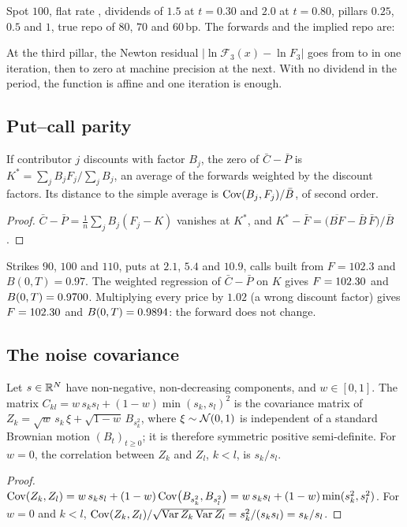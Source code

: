 \begin{example}\label{ex-bootstrap}
Spot $100$, flat rate , dividends of $\num{1.5}$ at $t=\num{0.30}$ and $\num{2.0}$ at $t=\num{0.80}$, pillars
$\num{0.25}$, $\num{0.5}$ and $1$, true repo of $80$, $70$ and $60$\,bp. The forwards and the implied repo are:
\begin{center}\end{center}
At the third pillar, the Newton residual $|\ln\mathcal F_3(x)-\ln F_3|$ goes from \vNewtonA{} to \vNewtonB{} in one
iteration, then to zero at machine precision at the next. With no dividend in the period, the function is affine and
one iteration is enough.
\end{example}

\subsection{Put--call parity}\label{app-parity}
\begin{lemma}
If contributor $j$ discounts with factor $B_j$, the zero of $\bar C-\bar P$ is $K^\ast=\sum_jB_jF_j\big/\sum_jB_j$, an
average of the forwards weighted by the discount factors. Its distance to the simple average is
$\operatorname{Cov}(B_j, F_j)/\bar B$, of second order.
\end{lemma}
\begin{proof}
$\bar C-\bar P=\frac1n\sum_jB_j(F_j-K)$ vanishes at $K^\ast$, and
$K^\ast-\bar F=\bigl(\overline{BF}-\bar B\,\bar F\bigr)/\bar B$.
\end{proof}

\begin{example}[Parity]\label{ex-parity}
Strikes $90$, $100$ and $110$, puts at $\num{2.1}$, $\num{5.4}$ and $\num{10.9}$, calls built from $F=\num{102.3}$ and
$B(0, T)=\num{0.97}$. The weighted regression of $\bar C-\bar P$ on $K$ gives $F=\num{102.30}$ and $B(0, T)=\num{0.9700}$.
Multiplying every price by $\num{1.02}$ (a wrong discount factor) gives $F=\num{102.30}$ and $B(0, T)=\num{0.9894}$: the
forward does not change.
\end{example}

\subsection{The noise covariance}\label{app-noise}
\begin{lemma}\label{lem-cumcov}
Let $s\in\mathbb{R}^N$ have non-negative, non-decreasing components, and $w\in[0,1]$. The matrix
$C_{kl}=w\,s_ks_l+(1-w)\min(s_k, s_l)^2$ is the covariance matrix of $Z_k=\sqrt{w}\,s_k\,\xi+\sqrt{1-w}\,B_{s_k^2}$,
where $\xi\sim\mathcal{N}(0, 1)$ is independent of a standard Brownian motion $(B_t)_{t\ge0}$; it is therefore symmetric positive
semi-definite. For $w=0$, the correlation between $Z_k$ and $Z_l$, $k<l$, is $s_k/s_l$.
\end{lemma}
\begin{proof}
$\operatorname{Cov}(Z_k, Z_l)=w\,s_ks_l+(1-w)\operatorname{Cov}\bigl(B_{s_k^2}, B_{s_l^2}\bigr)=w\,s_ks_l+(1-w)\min(s_k^2, s_l^2)$. For $w=0$ and
$k<l$, $\operatorname{Cov}(Z_k, Z_l)/\sqrt{\operatorname{Var} Z_k\operatorname{Var} Z_l}=s_k^2/(s_ks_l)=s_k/s_l$.
\end{proof}

